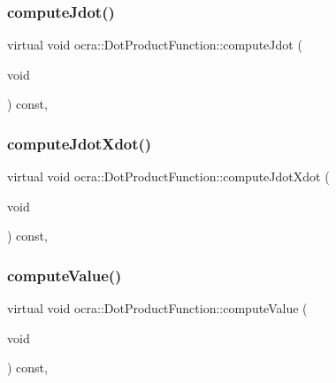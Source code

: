 \hypertarget{classocra_1_1DotProductFunction_a707474c43d42fad3a8c5bbd896ca8f4b}{}\label{classocra_1_1DotProductFunction_a707474c43d42fad3a8c5bbd896ca8f4b} 
\subsubsection{\texorpdfstring{compute\+Jdot()}{computeJdot()}}
{\footnotesize\ttfamily virtual void ocra\+::\+Dot\+Product\+Function\+::compute\+Jdot (\begin{DoxyParamCaption}\item[{void}]{ }\end{DoxyParamCaption}) const\hspace{0.3cm}{\ttfamily [protected]}, {\ttfamily [virtual]}}

\hypertarget{classocra_1_1DotProductFunction_a07f6a0a7e676a8849732f3469d70bcae}{}\label{classocra_1_1DotProductFunction_a07f6a0a7e676a8849732f3469d70bcae} 
\subsubsection{\texorpdfstring{compute\+Jdot\+Xdot()}{computeJdotXdot()}}
{\footnotesize\ttfamily virtual void ocra\+::\+Dot\+Product\+Function\+::compute\+Jdot\+Xdot (\begin{DoxyParamCaption}\item[{void}]{ }\end{DoxyParamCaption}) const\hspace{0.3cm}{\ttfamily [protected]}, {\ttfamily [virtual]}}

\hypertarget{classocra_1_1DotProductFunction_ac0dcd9911e638ebcd8e9594dbf0fa9ed}{}\label{classocra_1_1DotProductFunction_ac0dcd9911e638ebcd8e9594dbf0fa9ed} 
\subsubsection{\texorpdfstring{compute\+Value()}{computeValue()}}
{\footnotesize\ttfamily virtual void ocra\+::\+Dot\+Product\+Function\+::compute\+Value (\begin{DoxyParamCaption}\item[{void}]{ }\end{DoxyParamCaption}) const\hspace{0.3cm}{\ttfamily [protected]}, {\ttfamily [virtual]}}

